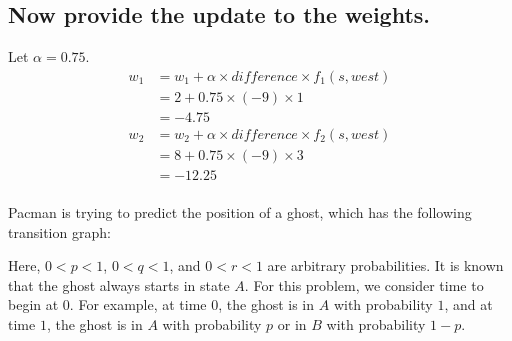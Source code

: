 \documentclass{homework}
\begin{document}
\subsection{Now provide the update to the weights.}
Let $\alpha = 0.75$.
\begin{align*}
    w_1 &= w_1 + \alpha \times difference \times f_1(s, west)\\
    &= 2 + 0.75 \times (-9) \times 1\\
    &= -4.75\\
    w_2 &= w_2 + \alpha \times difference \times f_2(s, west)\\
    &= 8 + 0.75 \times (-9) \times 3\\
    &= -12.25\\
\end{align*}


\clearpage
\exercise[8]
Pacman is trying to predict the position of a ghost, which has the following transition graph:

\begin{figure}[h!]
    \centering
    
\end{figure}

Here, $0 < p < 1$, $0 < q < 1$, and $0 < r < 1$ are arbitrary probabilities. It is known that the ghost always starts in state $A$. For this problem, we consider time to begin at $0$. For example, at time $0$, the ghost is in $A$ with probability $1$, and at time $1$, the ghost is in $A$ with probability $p$ or in $B$ with probability $1 - p$.
\end{document}
